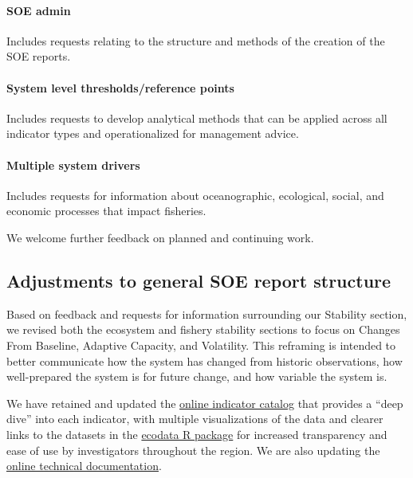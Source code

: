\documentclass[
  10pt,
]{article}
\begin{document}
\paragraph{SOE admin}\label{soe-admin}

Includes requests relating to the structure and methods of the creation
of the SOE reports.

\paragraph{System level thresholds/reference
points}\label{system-level-thresholdsreference-points}

Includes requests to develop analytical methods that can be applied
across all indicator types and operationalized for management advice.

\paragraph{Multiple system drivers}\label{multiple-system-drivers}

Includes requests for information about oceanographic, ecological,
social, and economic processes that impact fisheries.

We welcome further feedback on planned and continuing work.

\subsection{Adjustments to general SOE report
structure}\label{adjustments-to-general-soe-report-structure}

Based on feedback and requests for information surrounding our Stability
section, we revised both the ecosystem and fishery stability sections to
focus on Changes From Baseline, Adaptive Capacity, and Volatility. This
reframing is intended to better communicate how the system has changed
from historic observations, how well-prepared the system is for future
change, and how variable the system is.

We have retained and updated the
\href{https://noaa-edab.github.io/catalog/index.html}{online indicator
catalog} that provides a ``deep dive'' into each indicator, with
multiple visualizations of the data and clearer links to the datasets in
the \href{https://noaa-edab.github.io/ecodata/}{ecodata R package} for
increased transparency and ease of use by investigators throughout the
region. We are also updating the
\href{https://noaa-edab.github.io/tech-doc/}{online technical
documentation}.
\end{document}

